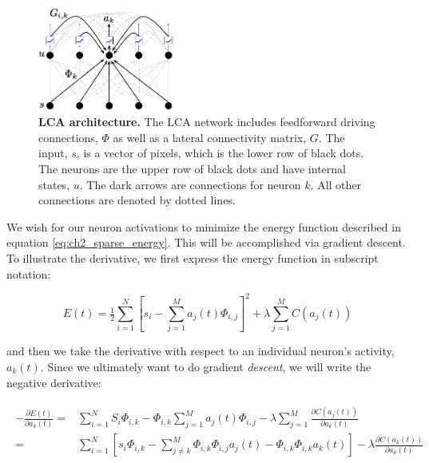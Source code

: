 \begin{figure}[h]
    \centering %
    \includegraphics[width=0.4\textwidth]{figures/lca_diagram.png}
    \caption{\textbf{LCA architecture.} The LCA network includes feedforward driving connections, $\Phi$ as well as a lateral connectivity matrix, $G$. The input, $s$, is a vector of pixels, which is the lower row of black dots. The neurons are the upper row of black dots and have internal states, $u$. The dark arrows are connections for neuron $k$. All other connections are denoted by dotted lines.}
    \label{fig:ch2_lca_diagram}
\end{figure}

We wish for our neuron activations to minimize the energy function described in equation \eqref{eq:ch2_sparse_energy}. This will be accomplished via gradient descent. To illustrate the derivative, we first express the energy function in subscript notation:

\begin{equation}\label{eq:ch2_subscript_sparse_energy_func}
    E(t) = \tfrac{1}{2} \sum\limits_{i=1}^{N} \left[ s_{i} - \sum\limits_{j=1}^{M}a_{j}(t) \Phi_{i,j} \right]^{2} + \lambda \sum\limits_{j=1}^{M} C(a_{j}(t))
\end{equation}

and then we take the derivative with respect to an individual neuron's activity, $a_{k}(t)$. Since we ultimately want to do gradient \textit{descent}, we will write the negative derivative:

\begin{align}\label{eq:ch2_lca_deda_extended}
\begin{split}
    - \frac{\partial E(t)}{\partial a_{k}(t)}
    =
        &\sum\limits_{i=1}^{N} S_{i} \Phi_{i,k} -
        \Phi_{i,k}\sum\limits_{j=1}^{M}a_{j}(t) \Phi_{i,j} -
        \lambda \sum\limits_{j=1}^{M}\frac{\partial C(a_{j}(t))}{\partial a_{k}(t)} \\
    =
        &\sum\limits_{i=1}^{N} \left[ s_{i} \Phi_{i,k} -
        \sum\limits_{j \neq k}^{M} \Phi_{i,k} \Phi_{i,j} a_{j}(t) - \Phi_{i,k}\Phi_{i,k}a_{k}(t) \right] -
        \lambda \frac{\partial C(a_{k}(t))}{\partial a_{k}(t)}
\end{split}
\end{align}

